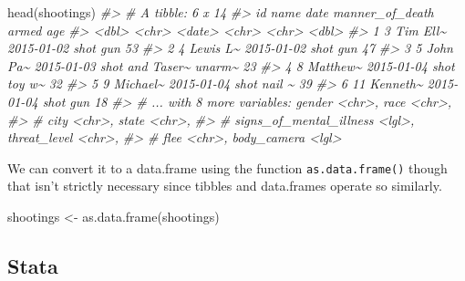 \documentclass[
  12pt,
  openany]{book}
\newenvironment{Shaded}{\begin{snugshade}}{\end{snugshade}}
\newcommand{\CommentTok}[1]{\textcolor[rgb]{0.37,0.37,0.37}{\textit{#1}}}
\newcommand{\FunctionTok}[1]{\textcolor[rgb]{0,0,0}{#1}}
\newcommand{\NormalTok}[1]{#1}
\newcommand{\OtherTok}[1]{\textcolor[rgb]{0.37,0.37,0.37}{#1}}
\begin{document}
\begin{Shaded}
\begin{Highlighting}[]
\FunctionTok{head}\NormalTok{(shootings)}
\CommentTok{\#\textgreater{} \# A tibble: 6 x 14}
\CommentTok{\#\textgreater{}      id name     date       manner\_of\_death armed    age}
\CommentTok{\#\textgreater{}   \textless{}dbl\textgreater{} \textless{}chr\textgreater{}    \textless{}date\textgreater{}     \textless{}chr\textgreater{}           \textless{}chr\textgreater{}  \textless{}dbl\textgreater{}}
\CommentTok{\#\textgreater{} 1     3 Tim Ell\textasciitilde{} 2015{-}01{-}02 shot            gun       53}
\CommentTok{\#\textgreater{} 2     4 Lewis L\textasciitilde{} 2015{-}01{-}02 shot            gun       47}
\CommentTok{\#\textgreater{} 3     5 John Pa\textasciitilde{} 2015{-}01{-}03 shot and Taser\textasciitilde{} unarm\textasciitilde{}    23}
\CommentTok{\#\textgreater{} 4     8 Matthew\textasciitilde{} 2015{-}01{-}04 shot            toy w\textasciitilde{}    32}
\CommentTok{\#\textgreater{} 5     9 Michael\textasciitilde{} 2015{-}01{-}04 shot            nail \textasciitilde{}    39}
\CommentTok{\#\textgreater{} 6    11 Kenneth\textasciitilde{} 2015{-}01{-}04 shot            gun       18}
\CommentTok{\#\textgreater{} \# ... with 8 more variables: gender \textless{}chr\textgreater{}, race \textless{}chr\textgreater{},}
\CommentTok{\#\textgreater{} \#   city \textless{}chr\textgreater{}, state \textless{}chr\textgreater{},}
\CommentTok{\#\textgreater{} \#   signs\_of\_mental\_illness \textless{}lgl\textgreater{}, threat\_level \textless{}chr\textgreater{},}
\CommentTok{\#\textgreater{} \#   flee \textless{}chr\textgreater{}, body\_camera \textless{}lgl\textgreater{}}
\end{Highlighting}
\end{Shaded}

We can convert it to a data.frame using the function \texttt{as.data.frame()} though that isn't strictly necessary since tibbles and data.frames operate so similarly.

\begin{Shaded}
\begin{Highlighting}[]
\NormalTok{shootings }\OtherTok{\textless{}{-}} \FunctionTok{as.data.frame}\NormalTok{(shootings)}
\end{Highlighting}
\end{Shaded}

\hypertarget{stata}{%
\subsection{Stata}\label{stata}}
\end{document}
